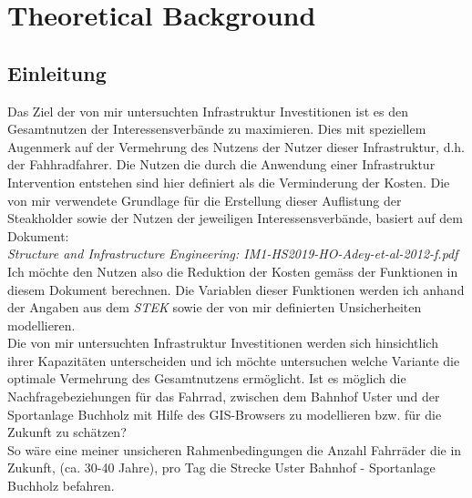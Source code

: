 %
%
%
%

\chapter{Theoretical Background}
\label{chap:background}

\section{\textbf{{Einleitung}}}

Das Ziel der von mir untersuchten Infrastruktur Investitionen ist es den Gesamtnutzen der Interessensverbände zu maximieren. \newline Dies mit speziellem Augenmerk auf der Vermehrung des Nutzens der Nutzer dieser Infrastruktur, d.h. der Fahhradfahrer. \newline
Die Nutzen die durch die Anwendung einer Infrastruktur Intervention entstehen sind hier definiert als die Verminderung der Kosten. \newline
Die von mir verwendete Grundlage für die Erstellung dieser Auflistung der Steakholder sowie der Nutzen der jeweiligen Interessensverbände, basiert auf dem Dokument: \\ [2ex]
\noindent\hspace*{10mm}\textit{Structure and Infrastructure Engineering: IM1-HS2019-HO-Adey-et-al-2012-f.pdf} \\ [2ex]
Ich möchte den Nutzen also die Reduktion der Kosten gemäss der Funktionen in diesem Dokument berechnen. 
Die Variablen dieser Funktionen werden ich anhand der Angaben aus dem \textit{STEK} sowie der von mir definierten Unsicherheiten modellieren. \\ [2ex]
Die von mir untersuchten Infrastruktur Investitionen werden sich hinsichtlich ihrer Kapazitäten unterscheiden und ich möchte untersuchen welche Variante die optimale Vermehrung des Gesamtnutzens ermöglicht. \newline
Ist es möglich die Nachfragebeziehungen für das Fahrrad, zwischen dem Bahnhof Uster und der Sportanlage Buchholz mit Hilfe des GIS-Browsers zu modellieren bzw. für die Zukunft zu schätzen? \\ [2ex]
So wäre eine meiner unsicheren Rahmenbedingungen die Anzahl Fahrräder die in Zukunft, \newline (ca. 30-40 Jahre), pro Tag die Strecke Uster Bahnhof - Sportanlage Buchholz befahren.

